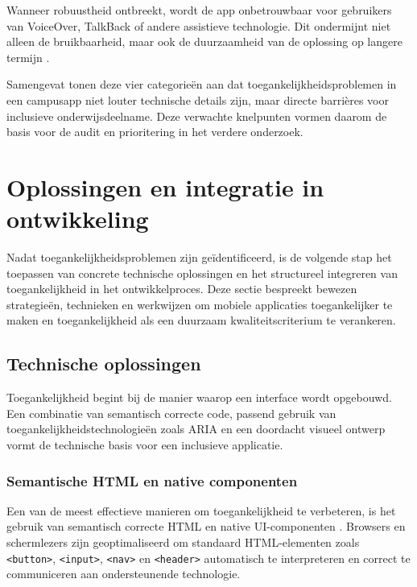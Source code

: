 Wanneer robuustheid ontbreekt, wordt de app onbetrouwbaar voor gebruikers van VoiceOver, TalkBack of andere assistieve technologie. Dit ondermijnt niet alleen de bruikbaarheid, maar ook de duurzaamheid van de oplossing op langere termijn \autocite{W3CWCAG21}.

Samengevat tonen deze vier categorieën aan dat toegankelijkheidsproblemen in een campusapp niet louter technische details zijn, maar directe barrières voor inclusieve onderwijsdeelname. Deze verwachte knelpunten vormen daarom de basis voor de audit en prioritering in het verdere onderzoek.


\section{Oplossingen en integratie in ontwikkeling}
\label{sec:oplossingen-integratie}

Nadat toegankelijkheidsproblemen zijn geïdentificeerd, is de volgende stap het toepassen van concrete technische oplossingen en het structureel integreren van toegankelijkheid in het ontwikkelproces. Deze sectie bespreekt bewezen strategieën, technieken en werkwijzen om mobiele applicaties toegankelijker te maken en toegankelijkheid als een duurzaam kwaliteitscriterium te verankeren.

\subsection{Technische oplossingen}
\label{subsec:technische-oplossingen}

Toegankelijkheid begint bij de manier waarop een interface wordt opgebouwd. Een combinatie van semantisch correcte code, passend gebruik van toegankelijkheidstechnologieën zoals ARIA en een doordacht visueel ontwerp vormt de technische basis voor een inclusieve applicatie.

\subsubsection{Semantische HTML en native componenten}
\label{subsubsec:semantische-html}

Een van de meest effectieve manieren om toegankelijkheid te verbeteren, is het gebruik van semantisch correcte HTML en native UI-componenten \autocite{MDN_Accessibility_nodate}. Browsers en schermlezers zijn geoptimaliseerd om standaard HTML-elementen zoals \texttt{<button>}, \texttt{<input>}, \texttt{<nav>} en \texttt{<header>} automatisch te interpreteren en correct te communiceren aan ondersteunende technologie.

